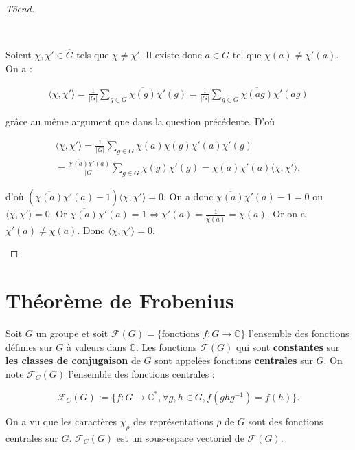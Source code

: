 \documentclass[french]{book}
\theoremstyle{definition}
\theoremstyle{remark}
\begin{document}
\begin{proof}[T\~{o}end]
\begin{enumerate}
    \

    Soient \(\chi, \chi' \in \hat{G}\) tels que \(\chi \neq \chi'\). Il existe donc \(a \in G\) tel que \(\chi(a) \neq \chi'(a)\). On a :

    \begin{gather*}
      \langle \chi, \chi' \rangle  = \frac{1}{\lvert G \rvert} \sum_{g \in G}^{} \overline{\chi(g)} \chi'(g) = \frac{1}{\lvert G \rvert} \sum_{g \in G} \overline{\chi(ag)} \chi'(ag)
    \end{gather*}

    grâce au même argument que dans la question précédente. D'où

    \begin{gather*}
      \langle \chi, \chi' \rangle = \frac{1}{\lvert G \rvert} \sum_{g \in G} \chi(a)\chi(g) \chi'(a)\chi'(g) \\
       = \frac{\overline{\chi(a)} \chi'(a)}{\lvert G \rvert} \sum_{g \in G}^{} \overline{\chi(g)} \chi'(g)  = \overline{\chi(a)} \chi'(a) \langle \chi, \chi' \rangle,
    \end{gather*}

    d'où \((\overline{\chi(a)} \chi'(a) - 1) \langle \chi, \chi' \rangle = 0\). On a donc \(\overline{\chi(a)} \chi'(a) - 1 = 0\) ou \(\langle \chi, \chi' \rangle = 0\). Or \(\overline{\chi(a)}\chi'(a) = 1 \iff \chi'(a) = \frac{1}{\overline{\chi}(a)} = \chi(a)\). Or on a \(\chi'(a) \neq \chi(a)\). Donc \(\langle \chi, \chi' \rangle = 0\).
  \end{enumerate}
\end{proof}

\section{Théorème de Frobenius}

Soit \(G\) un groupe et soit \(\mathscr{F}(G) = \{ \text{fonctions } f : G \longrightarrow \mathbb{C} \} \) l'ensemble des fonctions définies sur \(G\) à valeurs dans \(\mathbb{C}\). Les fonctions \(\mathscr{F}(G)\) qui sont \textbf{constantes} sur  \textbf{les classes de conjugaison} de \(G\) sont appelées fonctions \textbf{centrales} sur \(G\). On note \(\mathscr{F}_C(G)\) l'ensemble des fonctions centrales :

\[\mathscr{F}_C(G) := \{ f : G \longrightarrow \mathbb{C} ^{*}, \forall g, h \in G, f (ghg ^{-1}) = f(h)\}.\]

On a vu que les caractères \(\chi _{\rho}\) des représentations \(\rho\) de \(G\) sont des fonctions centrales sur \(G\). \(\mathscr{F}_C(G)\) est un sous-espace vectoriel de \(\mathscr{F}(G)\).
\end{document}
